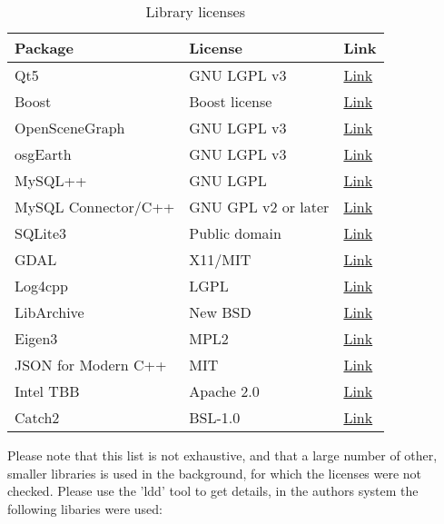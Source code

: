 \begin{table}[H]
  \center
  \begin{tabular}{ | l | l | l |}
    \hline
    \textbf{Package} & \textbf{License} & \textbf{Link} \\ \hline
    Qt5 & GNU LGPL v3 &\href{https://doc.qt.io/qt-5.10/licensing.html}{Link} \\ \hline
    Boost & Boost license  & \href{https://www.boost.org/users/license.html}{Link} \\ \hline
    OpenSceneGraph & GNU LGPL v3 &\href{http://www.openscenegraph.org/index.php/about/licensing}{Link} \\ \hline
    osgEarth & GNU LGPL v3 &\href{hhttps://github.com/gwaldron/osgearth/blob/master/LICENSE.txt}{Link} \\ \hline    
    MySQL++ & GNU LGPL & \href{https://tangentsoft.com/mysqlpp/wiki?name=FAQ}{Link} \\ \hline
    MySQL Connector/C++ & GNU GPL v2 or later & \href{https://downloads.mysql.com/docs/licenses/connector-cpp-gpl-en.pdf}{Link} \\ \hline
    SQLite3 & Public domain & \href{https://www.sqlite.org/copyright.html}{Link} \\ \hline
    GDAL & X11/MIT & \href{https://trac.osgeo.org/gdal/wiki/FAQGeneral#WhatlicensedoesGDALOGRuse}{Link} \\ \hline
    Log4cpp & LGPL & \href{http://log4cpp.sourceforge.net/#license}{Link} \\ \hline
    LibArchive & New BSD & \href{https://raw.githubusercontent.com/libarchive/libarchive/master/COPYING}{Link} \\ \hline
    Eigen3 & MPL2 & \href{http://eigen.tuxfamily.org/index.php?title=Main_Page}{Link} \\ \hline
    JSON for Modern C++ & MIT & \href{https://github.com/nlohmann/json}{Link} \\ \hline
    Intel TBB & Apache 2.0 & \href{https://www.threadingbuildingblocks.org/}{Link} \\ \hline
    Catch2 & BSL-1.0 & \href{https://github.com/catchorg/Catch2}{Link} \\ \hline
  \end{tabular}
  \caption{Library licenses}
\end{table}

Please note that this list is not exhaustive, and that a large number of other, smaller libraries is used in the background, for which the licenses were not checked. Please use the 'ldd' tool to get details, in the authors system the following libaries were used:

